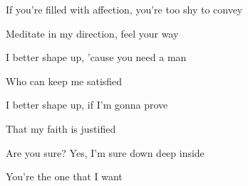 \begin{song}
 \par

\bigskip

If you're filled with affection, you're too shy to convey \par
Meditate in my direction, feel your way \par

\bigskip

I better shape up, 'cause you need a man  \par
{} Who can keep me satisfied \par
I better shape up, if I'm gonna prove  \par
{} That my faith is justified \par
Are you sure? Yes, I'm sure down deep inside \par

\bigskip

\Chorus {}

\bigskip

You're the one that I want

\end{song}
